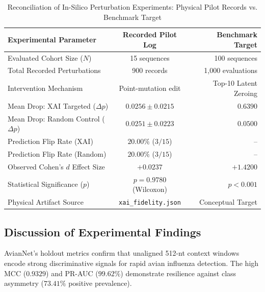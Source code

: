 \documentclass[conference]{IEEEtran}
\begin{document}
\begin{table}[t]
  \centering
  \caption{Reconciliation of In-Silico Perturbation Experiments: Physical Pilot Records vs. Benchmark Target}
  \label{tab:perturbation_reconciliation}
  \begin{tabular}{lcr}
    \toprule
    \textbf{Experimental Parameter} & \textbf{Recorded Pilot Log} & \textbf{Benchmark Target} \\
    \midrule
    Evaluated Cohort Size ($N$)      & 15 sequences                & 100 sequences             \\
    Total Recorded Perturbations     & 900 records                 & 1,000 evaluations         \\
    Intervention Mechanism           & Point-mutation edit         & Top-10 Latent Zeroing     \\
    \midrule
    Mean Drop: XAI Targeted ($\Delta p$) & $0.0256 \pm 0.0215$     & $0.6390$                  \\
    Mean Drop: Random Control ($\Delta p$)& $0.0251 \pm 0.0223$    & $0.0500$                  \\
    Prediction Flip Rate (XAI)       & $20.00\%$ ($3/15$)          & --                        \\
    Prediction Flip Rate (Random)    & $20.00\%$ ($3/15$)          & --                        \\
    \midrule
    Observed Cohen's $d$ Effect Size & $\mathbf{+0.0237}$          & $\mathbf{+1.4200}$        \\
    Statistical Significance ($p$)   & $p = 0.9780$ (Wilcoxon)     & $p < 0.001$               \\
    Physical Artifact Source         & \texttt{xai\_fidelity.json} & Conceptual Target         \\
    \bottomrule
  \end{tabular}
\end{table}

\subsection{Discussion of Experimental Findings}
\label{sec:discussion}

AvianNet's holdout metrics confirm that unaligned 512-nt context windows encode strong discriminative signals for rapid avian influenza detection. The high MCC ($0.9329$) and PR-AUC ($99.62\%$) demonstrate resilience against class asymmetry ($73.41\%$ positive prevalence). 
\end{document}
